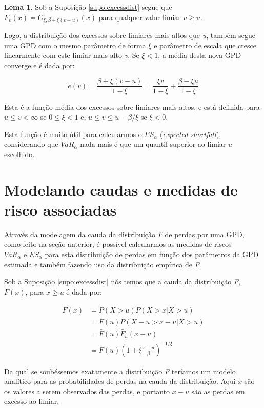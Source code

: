 \documentclass[review]{elsarticle}
\theoremstyle{definition}
\newtheorem{lema}[teor]{Lema}
\begin{document}
\begin{lema} \label{lema:ev}
	Sob a Suposição \ref{supo:excessdist} segue que $F_v (x)=G_{\xi,\beta+\xi(v-u)} (x)$ para qualquer valor limiar $v \geq u$.
\end{lema}

Logo, a distribuição dos excessos sobre limiares mais altos que \emph{u}, também segue uma GPD com o mesmo parâmetro de forma $\xi$ e parâmetro de escala que cresce linearmente com este limiar mais alto \emph{v}. Se $\xi < 1$, a média desta nova GPD converge e é dada por:

\begin{equation}
\label{eq:ev}
e(v)=\frac{\beta+\xi(v-u)}{1-\xi}=\frac{\xi v}{1- \xi}+ \frac{\beta-\xi u}{1-\xi}
\end{equation}

Esta é a função média dos excessos sobre limiares mais altos, e está definida para $u \leq v < \infty$ se $0 \leq \xi < 1$ e, $u \leq v \leq u-\beta / \xi$ se $\xi < 0$.

Esta função é muito útil para calcularmos o $ES_\alpha$ (\emph{expected shortfall}), considerando que $VaR_\alpha$ nada mais é que um quantil superior ao limiar $u$ escolhido.

\section{Modelando caudas e medidas de risco associadas}
\label{sec:caudas}

Através da modelagem da cauda da distribuição \emph{F} de perdas por uma GPD, como feito na seção anterior, é possível calcularmos as medidas de riscos $VaR_\alpha \text{ e } ES_\alpha$ para esta distribuição de perdas em função dos parâmetros da GPD estimada e também fazendo uso da distribuição empírica de \emph{F}.

Sob a Suposição \ref{supo:excessdist} nós temos que a cauda da distribuição \emph{F}, $\bar{F}(x)$, para $x \geq u$ é dada por:

\begin{align}
\label{eq:Ftail}
\bar{F}(x) & = P(X>u)P(X>x|X>u) \nonumber \\
& = \bar{F}(u) P(X-u>x-u|X>u) \nonumber \\
& = \bar{F}(u)\bar{F}_u(x-u) \nonumber \\
& = \bar{F}(u)\left(1+\xi \frac{x-u}{\beta}\right)^{-1/\xi}
\end{align}

Da qual se soubéssemos exatamente a distribuição \emph{F} teríamos um modelo analítico para as probabilidades de perdas na cauda da distribuição. Aqui $x$ são os valores a serem observados das perdas, e portanto $x-u$ são as perdas em excesso ao limiar.
\end{document}
